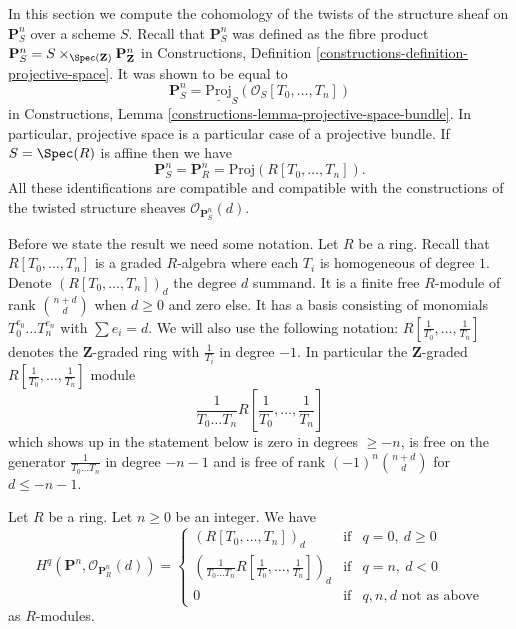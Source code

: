 \noindent
In this section we compute the cohomology of the twists of the
structure sheaf on $\mathbf{P}^n_S$ over a scheme $S$.
Recall that $\mathbf{P}^n_S$ was defined as the fibre product
$
\mathbf{P}^n_S = S \times_{\Spec(\mathbf{Z})} \mathbf{P}^n_{\mathbf{Z}}
$
in Constructions, Definition \ref{constructions-definition-projective-space}.
It was shown to be equal to
$$
\mathbf{P}^n_S = \underline{\text{Proj}}_S(\mathcal{O}_S[T_0, \ldots, T_n])
$$
in Constructions, Lemma \ref{constructions-lemma-projective-space-bundle}.
In particular, projective space is a particular case of a projective bundle.
If $S = \Spec(R)$ is affine then we have
$$
\mathbf{P}^n_S = \mathbf{P}^n_R = \text{Proj}(R[T_0, \ldots, T_n]).
$$
All these identifications are compatible and compatible with the constructions
of the twisted structure sheaves $\mathcal{O}_{\mathbf{P}^n_S}(d)$.

\medskip\noindent
Before we state the result we need some notation.
Let $R$ be a ring.
Recall that $R[T_0, \ldots, T_n]$ is a graded
$R$-algebra where each $T_i$ is homogeneous of degree $1$.
Denote $(R[T_0, \ldots, T_n])_d$ the degree $d$ summand.
It is a finite free $R$-module of rank $\binom{n + d}{d}$
when $d \geq 0$ and zero else.
It has a basis consisting of monomials $T_0^{e_0} \ldots T_n^{e_n}$
with $\sum e_i = d$. We will also use the following notation:
$R[\frac{1}{T_0}, \ldots, \frac{1}{T_n}]$ denotes the $\mathbf{Z}$-graded
ring with $\frac{1}{T_i}$ in degree $-1$. In particular the
$\mathbf{Z}$-graded $R[\frac{1}{T_0}, \ldots, \frac{1}{T_n}]$ module
$$
\frac{1}{T_0 \ldots T_n} R[\frac{1}{T_0}, \ldots, \frac{1}{T_n}]
$$
which shows up in the statement below is zero in degrees
$\geq -n$, is free on the generator $\frac{1}{T_0 \ldots T_n}$
in degree $-n - 1$ and is free of rank $(-1)^n\binom{n + d}{d}$ for
$d \leq -n - 1$.

\begin{lemma}
\label{lemma-cohomology-projective-space-over-ring}
\begin{reference}
\cite[III Proposition 2.1.12]{EGA}
\end{reference}
Let $R$ be a ring.
Let $n \geq 0$ be an integer.
We have
$$
H^q(\mathbf{P}^n, \mathcal{O}_{\mathbf{P}^n_R}(d)) =
\left\{
\begin{matrix}
(R[T_0, \ldots, T_n])_d & \text{if} & q = 0,\ d \geq 0 \\
\left(\frac{1}{T_0 \ldots T_n} R[\frac{1}{T_0}, \ldots, \frac{1}{T_n}]\right)_d
& \text{if} & q = n,\ d < 0 \\
0 & \text{if} & q, n, d\text{ not as above}
\end{matrix}
\right.
$$
as $R$-modules.
\end{lemma}

